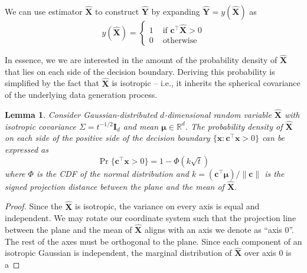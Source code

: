 \documentclass[12pt]{article}
\newtheorem{lemma}{Lemma}
\begin{document}
We can use estimator $\hat{\mathbf X}$ to construct $\hat{\mathbf Y}$ by expanding $\hat{\mathbf Y} = y(\hat{\mathbf X})$ as 
\begin{equation}
	y(\hat{\mathbf X}) = \begin{cases}
		1 & \text{ if } \mathbf c^\top \hat{\mathbf X} > 0 \\ 
		0 & \text{ otherwise } 
	\end{cases}
\end{equation}

In essence, we we are interested in the amount of the probability density of $\hat{\mathbf X}$ that lies on each side of the decision boundary. 
Deriving this probability is simplified by the fact that $\hat{\mathbf X}$ is isotropic -- i.e., it inherits the spherical covariance of the underlying data generation process. 

\begin{lemma}
	Consider Gaussian-distributed $d$-dimensional random variable $\hat{\mathbf X}$ with isotropic covariance $\Sigma = t^{-1/2}\mathbf I_d$ and mean $\mathbf \mu \in \mathbb R^d$.
	The probability density of $\hat{\mathbf X}$ on each side of the positive side of the decision boundary $\{\mathbf x : \mathbf c^\top \mathbf x > 0\}$ can be expressed as 
	\begin{equation}
		\label{eqn:class_prob}
		\Pr\{\mathbf c^\top \mathbf x > 0\} = 1-\Phi(k\sqrt{t})
	\end{equation}
	where $\Phi$ is the CDF of the normal distribution and $k = \mathbf{(c^\top \mu)/ \|c\|}$ is the signed projection distance between the plane and the mean of $\hat{\mathbf X}$. 
\end{lemma}
\begin{proof}
	Since the $\hat{\mathbf X}$ is isotropic, the variance on every axis is equal and independent. 
	We may rotate our coordinate system such that the projection line between the plane and the mean of $\hat{\mathbf X}$ aligns with an axis we denote as ``axis 0''. 
	The rest of the axes must be orthogonal to the plane. 
	Since each component of an isotropic Gaussian is independent, the marginal distribution of $\hat{\mathbf X}$ over axis 0 is a 
\end{proof}
\end{document}
